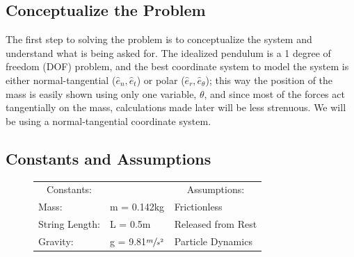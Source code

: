 \documentclass[12pt]{report}
\begin{document}

{\tableofcontents\let\clearpage\relax\listoffigures}
\clearpage
{}
\newpage
\begin{flushleft}
\section{Conceptualize the Problem}

The first step to solving the problem is to conceptualize the system and understand what is being asked for. The idealized pendulum is a 1 degree of freedom (DOF) problem, and the best coordinate system to model the system is either normal-tangential ($\hat{e}_n,\hat{e}_t$) or polar ($\hat{e}_r,\hat{e}_\theta$); this way the position of the mass is easily shown using only one variable, $\theta$, and since most of the forces act tangentially on the mass, calculations made later will be less strenuous. We will be using a normal-tangential coordinate system.

\subsection{Constants and Assumptions}

\begin{figure}[h]
  \centering
   \begin{minipage}[c]{.2\textwidth}
      
   \end{minipage}%
   \begin{minipage}[c]{.8\textwidth}
     \begin{tabular}{ll@{\hskip .75in}l}
       \multicolumn{1}{c}{Constants:} && \multicolumn{1}{c}{Assumptions:} \\
       Mass: &m = 0.142kg & Frictionless\\
       String Length: &L = 0.5m & Released from Rest\\
       Gravity: &g = 9.81$\sfrac{m}{s^2}$ & Particle Dynamics\\
     \end{tabular}
   \end{minipage}
 \end{figure}


\end{flushleft}
\end{document}
